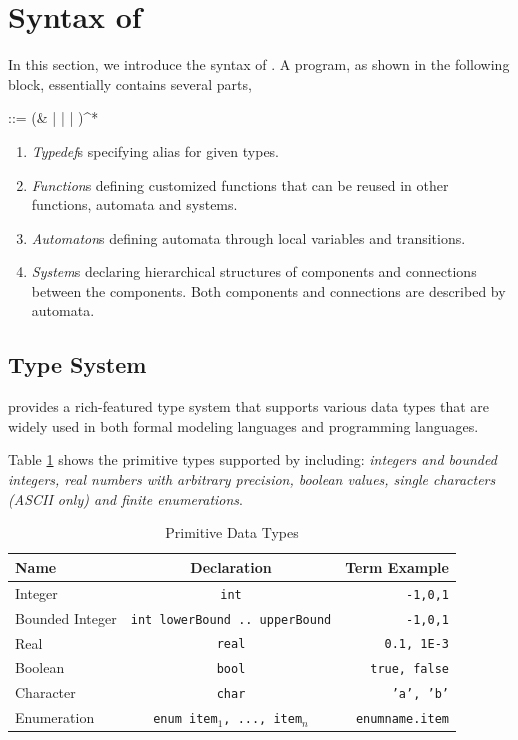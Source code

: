\section{Syntax of \lang{}}
\label{sec:syntax}

In this section, we introduce the syntax of \lang{}. A \lang{} program, as shown in the following block, essentially contains several parts,
\begin{bnf}
     ::=  (&  |  |  | )^*
\end{bnf}

\begin{enumerate}
    \item \emph{Typedef}s specifying alias for given types.
    \item \emph{Function}s defining customized functions that can be reused in other functions, automata and systems.
    \item \emph{Automaton}s defining automata through local variables and transitions.
    \item \emph{System}s declaring hierarchical structures of components and connections between the components. Both components and connections are described by automata.
\end{enumerate}

\subsection{Type System}
\label{subsec:typesystem}
\lang{} provides a rich-featured type system that supports various data types that are widely used in both formal modeling languages and programming languages.

 Table \ref{table:primitivetypes} shows the primitive types supported by \lang{} including: \emph{ integers and bounded integers,  real numbers with arbitrary precision, boolean values, single characters (ASCII only) and finite enumerations}.

\begin{table}
    \caption{Primitive Data Types}
    \label{table:primitivetypes}
    \centering
    \begin{tabular}{lcr}
        \hline
        Name & Declaration & Term Example \T\B \\
        \hline
        \T 
        Integer & \texttt{int} & \texttt{-1,0,1} \\
        Bounded Integer\hspace{0.5cm} & \texttt{int lowerBound .. upperBound}\hspace{0.5cm} & \texttt{-1,0,1} \\
        Real & \texttt{real} & \texttt{0.1, 1E-3} \\
        Boolean & \texttt{bool} & \texttt{true, false} \\
        Character & \texttt{char} & \texttt{'a', 'b'} \\
        \B Enumeration & \texttt{enum {item$_1$, ..., item$_n$}} & \texttt{enumname.item} \\
        \hline
    \end{tabular}
\end{table}

